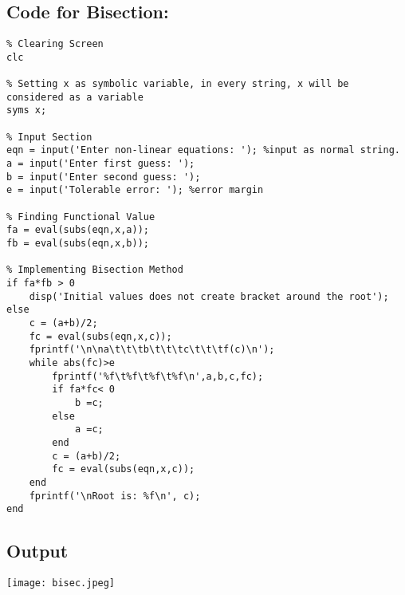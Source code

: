\subsection*{Code for Bisection:}
\begin{verbatim}
% Clearing Screen
clc

% Setting x as symbolic variable, in every string, x will be considered as a variable
syms x;

% Input Section
eqn = input('Enter non-linear equations: '); %input as normal string.
a = input('Enter first guess: ');
b = input('Enter second guess: ');
e = input('Tolerable error: '); %error margin

% Finding Functional Value
fa = eval(subs(eqn,x,a));
fb = eval(subs(eqn,x,b));

% Implementing Bisection Method
if fa*fb > 0 
    disp('Initial values does not create bracket around the root');
else
    c = (a+b)/2;
    fc = eval(subs(eqn,x,c));
    fprintf('\n\na\t\t\tb\t\t\tc\t\t\tf(c)\n');
    while abs(fc)>e
        fprintf('%f\t%f\t%f\t%f\n',a,b,c,fc);
        if fa*fc< 0
            b =c;
        else
            a =c;
        end
        c = (a+b)/2;
        fc = eval(subs(eqn,x,c));
    end
    fprintf('\nRoot is: %f\n', c);
end
\end{verbatim}
\subsection*{Output}
\begin{center}
    \centering
    \texttt{[image: bisec.jpeg]}
\end{center}



